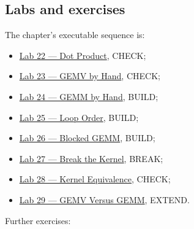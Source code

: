 \documentclass[
  10pt,
]{article}
\providecommand{\tightlist}{%
  \setlength{\itemsep}{0pt}\setlength{\parskip}{0pt}}
\begin{document}
\subsection{Labs and exercises}\label{labs-and-exercises}

The chapter's executable sequence is:

\begin{itemize}
\tightlist
\item
  \href{https://github.com/hermonai/inside-the-llm-engine/blob/astra-visual-rewrite/labs/lab-22-dot-product.md}{Lab
  22 --- Dot Product}, CHECK;
\item
  \href{https://github.com/hermonai/inside-the-llm-engine/blob/astra-visual-rewrite/labs/lab-23-gemv-by-hand.md}{Lab
  23 --- GEMV by Hand}, CHECK;
\item
  \href{https://github.com/hermonai/inside-the-llm-engine/blob/astra-visual-rewrite/labs/lab-24-gemm-by-hand.md}{Lab
  24 --- GEMM by Hand}, BUILD;
\item
  \href{https://github.com/hermonai/inside-the-llm-engine/blob/astra-visual-rewrite/labs/lab-25-loop-order.md}{Lab
  25 --- Loop Order}, BUILD;
\item
  \href{https://github.com/hermonai/inside-the-llm-engine/blob/astra-visual-rewrite/labs/lab-26-blocked-gemm.md}{Lab
  26 --- Blocked GEMM}, BUILD;
\item
  \href{https://github.com/hermonai/inside-the-llm-engine/blob/astra-visual-rewrite/labs/lab-27-break-the-kernel.md}{Lab
  27 --- Break the Kernel}, BREAK;
\item
  \href{https://github.com/hermonai/inside-the-llm-engine/blob/astra-visual-rewrite/labs/lab-28-kernel-equivalence.md}{Lab
  28 --- Kernel Equivalence}, CHECK;
\item
  \href{https://github.com/hermonai/inside-the-llm-engine/blob/astra-visual-rewrite/labs/lab-29-gemv-vs-gemm.md}{Lab
  29 --- GEMV Versus GEMM}, EXTEND.
\end{itemize}

Further exercises:
\end{document}
